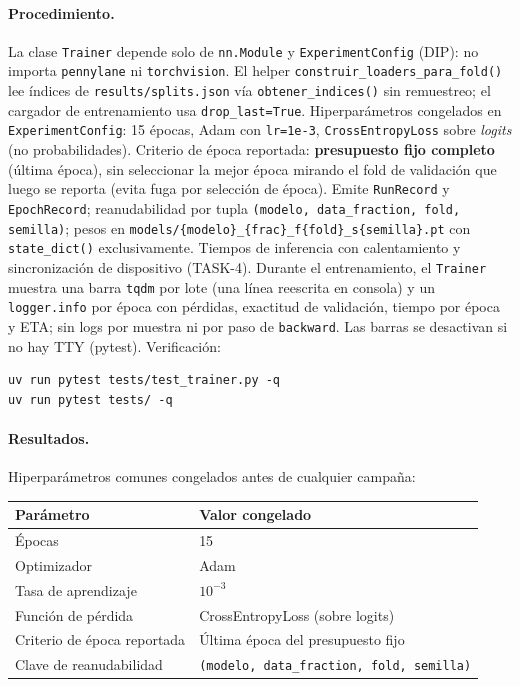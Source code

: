 \paragraph{Procedimiento.}
La clase \texttt{Trainer} depende solo de \texttt{nn.Module} y \texttt{ExperimentConfig}
(DIP): no importa \texttt{pennylane} ni \texttt{torchvision}. El helper
\texttt{construir\_loaders\_para\_fold()} lee índices de \texttt{results/splits.json} vía
\texttt{obtener\_indices()} sin remuestreo; el cargador de entrenamiento usa
\texttt{drop\_last=True}. Hiperparámetros congelados en \texttt{ExperimentConfig}:
15 épocas, Adam con \texttt{lr=1e-3}, \texttt{CrossEntropyLoss} sobre \textit{logits}
(no probabilidades). Criterio de época reportada: \textbf{presupuesto fijo completo}
(última época), sin seleccionar la mejor época mirando el fold de validación que luego
se reporta (evita fuga por selección de época). Emite \texttt{RunRecord} y
\texttt{EpochRecord}; reanudabilidad por tupla \texttt{(modelo, data\_fraction, fold, semilla)};
pesos en \texttt{models/\{modelo\}\_\{frac\}\_f\{fold\}\_s\{semilla\}.pt} con
\texttt{state\_dict()} exclusivamente. Tiempos de inferencia con calentamiento y
sincronización de dispositivo (TASK-4). Durante el entrenamiento, el \texttt{Trainer}
muestra una barra \texttt{tqdm} por lote (una línea reescrita en consola) y un
\texttt{logger.info} por época con pérdidas, exactitud de validación, tiempo por época
y ETA; sin logs por muestra ni por paso de \texttt{backward}. Las barras se desactivan
si no hay TTY (pytest). Verificación:
\begin{verbatim}
uv run pytest tests/test_trainer.py -q
uv run pytest tests/ -q
\end{verbatim}

\paragraph{Resultados.}
Hiperparámetros comunes congelados antes de cualquier campaña:

\begin{center}
\small
\begin{tabular}{ll}\hline
\textbf{Parámetro} & \textbf{Valor congelado} \\\hline
Épocas & 15 \\
Optimizador & Adam \\
Tasa de aprendizaje & $10^{-3}$ \\
Función de pérdida & CrossEntropyLoss (sobre logits) \\
Criterio de época reportada & Última época del presupuesto fijo \\
Clave de reanudabilidad & \texttt{(modelo, data\_fraction, fold, semilla)} \\\hline
\end{tabular}
\end{center}

